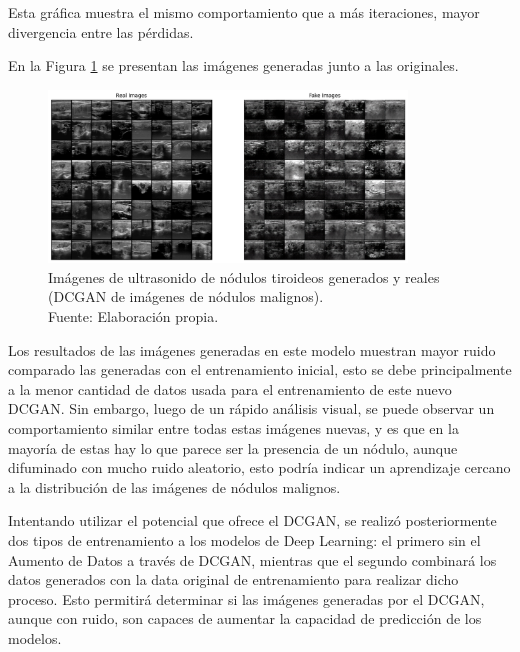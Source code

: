 Esta gráfica muestra el mismo comportamiento que a más iteraciones, mayor divergencia entre las pérdidas.

En la Figura \ref{4:fig118} se presentan las imágenes generadas junto a las originales.

\begin{figure}[H]
	\begin{center}
		\includegraphics[width=0.85\textwidth]{4/figures/generated_real_2.png}
		\caption[Imágenes de ultrasonido de nódulos tiroideos generados y reales (DCGAN de imágenes de nódulos malignos)]{Imágenes de ultrasonido de nódulos tiroideos generados y reales (DCGAN de imágenes de nódulos malignos). \\
		Fuente: Elaboración propia.}
		\label{4:fig118}
	\end{center}
\end{figure}

Los resultados de las imágenes generadas en este modelo muestran mayor ruido comparado las generadas con el entrenamiento inicial, esto se debe principalmente a la menor cantidad de datos usada para el entrenamiento de este nuevo DCGAN. Sin embargo, luego de un rápido análisis visual, se puede observar un comportamiento similar entre todas estas imágenes nuevas, y es que en la mayoría de estas hay lo que parece ser la presencia de un nódulo, aunque difuminado con mucho ruido aleatorio, esto podría indicar un aprendizaje cercano a la distribución de las imágenes de nódulos malignos.

Intentando utilizar el potencial que ofrece el DCGAN, se realizó posteriormente dos tipos de entrenamiento a los modelos de Deep Learning: el primero sin el Aumento de Datos a través de DCGAN, mientras que el segundo combinará los datos generados con la data original de entrenamiento para realizar dicho proceso. Esto permitirá determinar si las imágenes generadas por el DCGAN, aunque con ruido, son capaces de aumentar la capacidad de predicción de los modelos.

